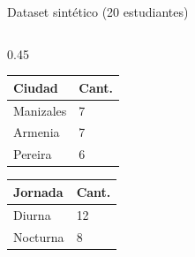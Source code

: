 \documentclass[aspectratio=169, 10pt]{beamer}
\begin{document}
\begin{frame}{Dataset sintético (20 estudiantes)}
\begin{columns}[T]
\begin{column}{0.45\textwidth}
      \vspace{0.15cm}
      \small
      \begin{tabular}{ll}
        \textbf{Ciudad} & \textbf{Cant.} \\
        \hline
        Manizales & 7 \\
        Armenia   & 7 \\
        Pereira   & 6 \\
      \end{tabular}
      \hspace{0.3cm}
      \begin{tabular}{ll}
        \textbf{Jornada} & \textbf{Cant.} \\
        \hline
        Diurna   & 12 \\
        Nocturna &  8 \\
      \end{tabular}
    \end{column}
  \end{columns}
\end{frame}
\end{document}
